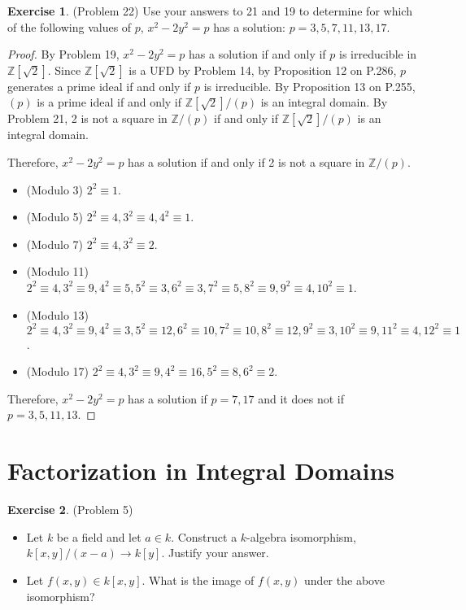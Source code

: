 \documentclass[12pt, psamsfonts]{amsart}
\theoremstyle{definition}
\newtheorem*{exer}{Exercise}
\theoremstyle{remark}
\numberwithin{equation}{section}
\begin{document}
\begin{exer}{(Problem 22)}
  Use your answers to 21 and 19 to determine for which of the following values of $p$, $x^2 - 2y^2 = p$ has a solution: $p = 3, 5, 7, 11, 13, 17$.
\end{exer}

\begin{proof}
  By Problem 19, $x^2 - 2y^2 = p$ has a solution if and only if $p$ is irreducible in $\mathbb{Z}[\sqrt{2}]$.
  Since $\mathbb{Z}[\sqrt{2}]$ is a UFD by Problem 14, by Proposition 12 on P.286, $p$ generates a prime ideal if and only if $p$ is irreducible.
  By Proposition 13 on P.255, $(p)$ is a prime ideal if and only if $\mathbb{Z}[\sqrt{2}]/(p)$ is an integral domain.
  By Problem 21, 2 is not a square in $\mathbb{Z}/(p)$ if and only if $\mathbb{Z}[\sqrt{2}]/(p)$ is an integral domain.

  Therefore, $x^2 - 2y^2 = p$ has a solution if and only if 2 is not a square in $\mathbb{Z}/(p)$.

  \begin{itemize}
    \item (Modulo 3)
      $2^2 \equiv 1$.
    \item (Modulo 5)
      $2^2 \equiv 4, 3^2 \equiv 4, 4^2 \equiv 1$.
    \item (Modulo 7)
      $2^2 \equiv 4, 3^2 \equiv 2$.
    \item (Modulo 11)
      $2^2 \equiv 4, 3^2 \equiv 9, 4^2 \equiv 5, 5^2 \equiv 3, 6^2 \equiv 3, 7^2 \equiv 5, 8^2 \equiv 9, 9^2 \equiv 4, 10^2 \equiv 1$.
    \item (Modulo 13)
      $2^2 \equiv 4, 3^2 \equiv 9, 4^2 \equiv 3, 5^2 \equiv 12, 6^2 \equiv 10, 7^2 \equiv 10, 8^2 \equiv 12, 9^2 \equiv 3, 10^2 \equiv 9, 11^2 \equiv 4, 12^2 \equiv 1$.
    \item (Modulo 17)
      $2^2 \equiv 4, 3^2 \equiv 9, 4^2 \equiv 16, 5^2 \equiv 8, 6^2 \equiv 2$.
  \end{itemize}

  Therefore, $x^2 - 2y^2 = p$ has a solution if $p = 7, 17$ and it does not if $p = 3, 5, 11, 13$.
\end{proof}

\section{Factorization in Integral Domains}

\begin{exer}{(Problem 5)}
  $ $
  \begin{itemize}
    \item
      Let $k$ be a field and let $a \in k$.
      Construct a $k$-algebra isomorphism, $k[x, y] / (x - a) \rightarrow k[y]$.
      Justify your answer.
    \item
      Let $f(x, y) \in k[x, y]$.
      What is the image of $f(x, y)$ under the above isomorphism?
  \end{itemize}
\end{exer}
\end{document}
